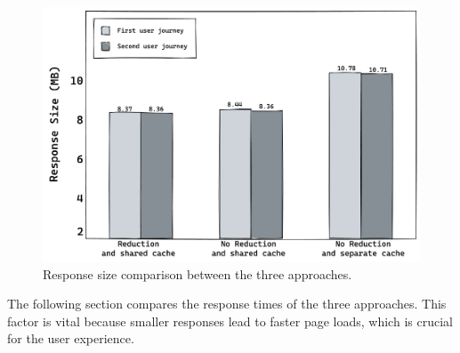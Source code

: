 
\ifshowImages
\begin{figure}[H]
  \centering
  \includegraphics[width=0.9\linewidth]{images/discussion/response-size.png}
  \caption{Response size comparison between the three approaches.}\label{fig:discussion:response-size}
\end{figure}
\fi

\noindent The following section compares the response times of the three approaches. This factor is vital because smaller responses lead to faster page loads, which is crucial for the user experience.

